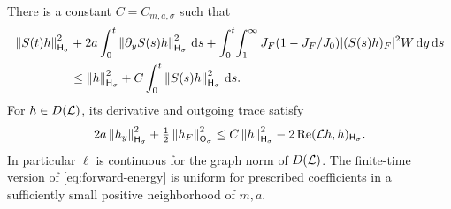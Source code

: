 \begin{lemma}\label{lem:forward-energy}
There is a constant $C=C_{m,a,\sigma}$ such that
\begin{align}\label{eq:forward-energy}
 \left\|S(t)h\right\|_{\mathsf H_\sigma}^2
 &+2a\int_0^t\left\|\partial_yS(s)h\right\|_{\mathsf H_\sigma}^2\,\mathrm d s
 +\int_0^t\!\int_1^\infty J_F(1-J_F/J_0)
       |(S(s)h)_F|^2W\,\mathrm d y\,\mathrm d s\notag\\
 &\le \left\|h\right\|_{\mathsf H_\sigma}^2+
 C\int_0^t\left\|S(s)h\right\|_{\mathsf H_\sigma}^2\,\mathrm d s.
\end{align}
For $h\in D(\mathcal L)$, its derivative and outgoing trace satisfy
\begin{equation}\label{eq:domain-energy}
 2a\left\|h_y\right\|_{\mathsf H_\sigma}^2+\tfrac12\left\|h_F\right\|_{\mathsf O_\sigma}^2
 \le C\left\|h\right\|_{\mathsf H_\sigma}^2-2\operatorname{Re}(\mathcal L h,h)_{\mathsf H_\sigma}.
\end{equation}
In particular $\ell$ is continuous for the graph norm of $D(\mathcal L)$.
The finite-time version of \eqref{eq:forward-energy} is uniform for
prescribed coefficients in a sufficiently small positive neighborhood of $m,a$.
\end{lemma}

